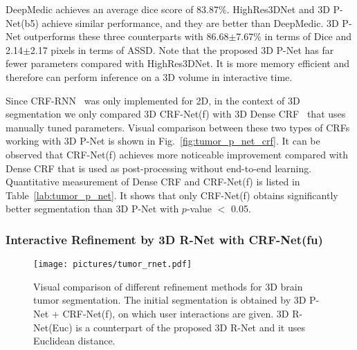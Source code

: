 \documentclass[10pt,journal,compsoc]{IEEEtran}
\begin{document}
DeepMedic achieves an average dice score of 83.87$\%$. HighRes3DNet and 3D P-Net(b5) achieve similar performance, and they are better than DeepMedic. 3D P-Net outperforms these three counterparts with
86.68$\pm$7.67\% in terms of Dice and 2.14$\pm$2.17 pixels in terms of ASSD. Note that the proposed 3D P-Net has far fewer parameters compared with HighRes3DNet. It is more memory efficient and therefore can perform inference on a 3D volume in interactive time.    

Since CRF-RNN~\cite{Zheng2015a} was only implemented for 2D, in the context of 3D segmentation we only compared 3D CRF-Net(f) with 3D Dense CRF~\cite{Kamnitsas2017} that uses manually tuned parameters. Visual comparison between these two types of CRFs working with 3D P-Net is shown in Fig.~\ref{fig:tumor_p_net_crf}. It can be observed that CRF-Net(f) achieves more noticeable improvement compared with Dense CRF that is used as post-processing without end-to-end learning. Quantitative measurement of Dense CRF and CRF-Net(f) is listed in Table~\ref{lab:tumor_p_net}. It shows that only CRF-Net(f) obtains significantly better segmentation than 3D P-Net with $p$-value $<$ 0.05. %
\subsubsection{Interactive Refinement by 3D R-Net with CRF-Net(fu) }

\begin{figure*}[t]
	\centering
	\texttt{[image: pictures/tumor\_rnet.pdf]}
	\caption[Visual comparison of different refinement methods for 3D brain tumor segmentation.]{ 
			Visual comparison of different refinement methods for 3D brain tumor segmentation. The initial segmentation is obtained by 3D P-Net + CRF-Net(f), on which user interactions are given. 3D R-Net(Euc) is a counterpart of the proposed 3D R-Net and it uses Euclidean distance. } 
	\label{fig:tumor_r_net_crf}
\end{figure*}
\end{document}
